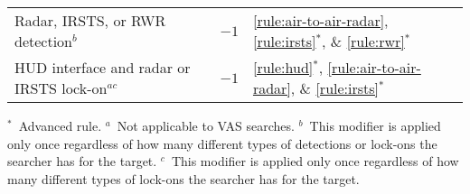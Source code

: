 {\begin{twocolumntablefloat}
\begin{twocolumntable}
\begin{tabularx}{0.6\linewidth}{Xll}
Radar, IRSTS, or RWR detection$^b$&$-1$&\ref{rule:air-to-air-radar}, \ref{rule:irsts}$^*$, \& \ref{rule:rwr}$^*$\\
HUD interface and radar or IRSTS lock-on$^{ac}$&$-1$& \ref{rule:hud}$^*$, \ref{rule:air-to-air-radar}, \& \ref{rule:irsts}$^*$\\
\bottomrule
\end{tabularx}
\begin{tablenote}{0.6\linewidth}
$^*$~Advanced rule. $^a$~Not applicable to VAS searches. $^b$~This modifier is applied only once regardless of how many different types of detections or lock-ons the searcher has for the target.  $^c$~This modifier is applied only once regardless of how many different types of lock-ons the searcher has for the target.
\end{tablenote}
\end{twocolumntable}


\end{twocolumntablefloat}
}
